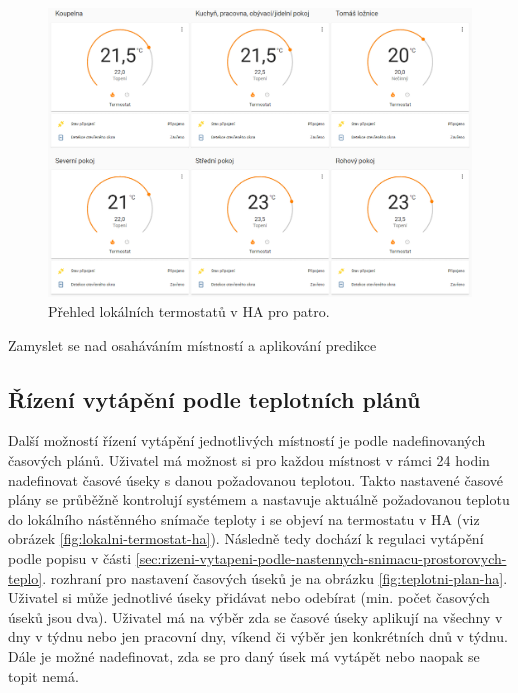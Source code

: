 \begin{figure}[H]
    \centering
    \includegraphics[width=\textwidth]{images/software-ha/prehled-lokalnich-termostaty-patro.png}
    \caption{Přehled lokálních termostatů v HA pro patro.}
    \label{fig:prehled-lokalnich-termostaty-patro}
\end{figure}

Zamyslet se nad osaháváním místností a aplikování predikce 

\subsection{Řízení vytápění podle teplotních plánů} 
\label{sec:rizeni-vytapeni-podle-teplotnich-planu}
Další možností řízení vytápění jednotlivých místností je podle nadefinovaných časových plánů. Uživatel má možnost si pro každou místnost v rámci 24 hodin nadefinovat časové úseky s danou požadovanou teplotou. Takto nastavené časové plány se průběžně kontrolují systémem a nastavuje aktuálně požadovanou teplotu do lokálního nástěnného snímače teploty i se objeví na termostatu v HA (viz obrázek \ref{fig:lokalni-termostat-ha}). Následně tedy dochází k regulaci vytápění podle popisu v části \ref{sec:rizeni-vytapeni-podle-nastennych-snimacu-prostorovych-teplo}. rozhraní pro nastavení časových úseků je na obrázku \ref{fig:teplotni-plan-ha}. Uživatel si může jednotlivé úseky přidávat nebo odebírat (min. počet časových úseků jsou dva). Uživatel má na výběr zda se časové úseky aplikují na všechny v dny v týdnu nebo jen pracovní dny, víkend či výběr jen konkrétních dnů v týdnu. Dále je možné nadefinovat, zda se pro daný úsek má vytápět nebo naopak se topit nemá.


